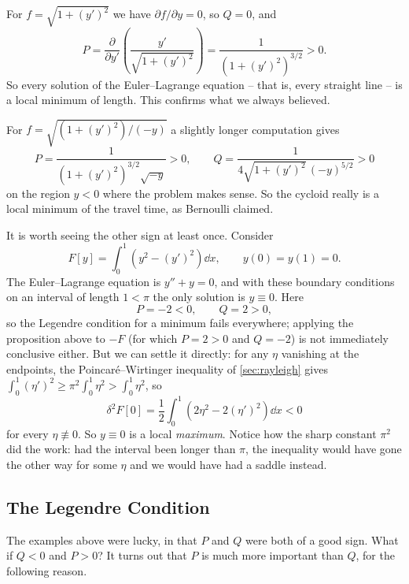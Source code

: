 \documentclass[a4paper]{scrartcl}
\begin{document}
\begin{example}
	For $f = \sqrt{1 + (y')^2}$ we have $\partial f/\partial y = 0$, so $Q = 0$, and
	$$
	P = \frac{\partial}{\partial y'}\left(\frac{y'}{\sqrt{1 + (y')^2}}\right) = \frac{1}{\left(1 + (y')^2\right)^{3/2}} > 0.
	$$
	So every solution of the Euler--Lagrange equation -- that is, every straight line -- is a local minimum of length. This confirms what we always believed.
\end{example}

\begin{example}
	For $f = \sqrt{(1 + (y')^2)/(-y)}$ a slightly longer computation gives
	$$
	P = \frac{1}{\left(1 + (y')^2\right)^{3/2}\sqrt{-y}} > 0, \qquad Q = \frac{1}{4\sqrt{1 + (y')^2}\,(-y)^{5/2}} > 0
	$$
	on the region $y < 0$ where the problem makes sense. So the cycloid really is a local minimum of the travel time, as Bernoulli claimed.
\end{example}

\begin{example}[A Maximum]
	It is worth seeing the other sign at least once. Consider
	$$
	F[y] = \int_0^1\left(y^2 - (y')^2\right)\dd x, \qquad y(0) = y(1) = 0.
	$$
	The Euler--Lagrange equation is $y'' + y = 0$, and with these boundary conditions on an interval of length $1 < \pi$ the only solution is $y \equiv 0$. Here
	$$
	P = -2 < 0, \qquad Q = 2 > 0,
	$$
	so the Legendre condition for a minimum fails everywhere; applying the proposition above to $-F$ (for which $P = 2 > 0$ and $Q = -2$) is not immediately conclusive either. But we can settle it directly: for any $\eta$ vanishing at the endpoints, the Poincar\'e--Wirtinger inequality of \autoref{sec:rayleigh} gives $\int_0^1 (\eta')^2 \geq \pi^2\int_0^1\eta^2 > \int_0^1 \eta^2$, so
	$$
	\delta^2 F[0] = \frac{1}{2}\int_0^1\left(2\eta^2 - 2(\eta')^2\right)\dd x < 0
	$$
	for every $\eta \not\equiv 0$. So $y \equiv 0$ is a local \emph{maximum}. Notice how the sharp constant $\pi^2$ did the work: had the interval been longer than $\pi$, the inequality would have gone the other way for some $\eta$ and we would have had a saddle instead.
\end{example}

\subsection{The Legendre Condition}

The examples above were lucky, in that $P$ and $Q$ were both of a good sign. What if $Q < 0$ and $P > 0$? It turns out that $P$ is much more important than $Q$, for the following reason.
\end{document}
